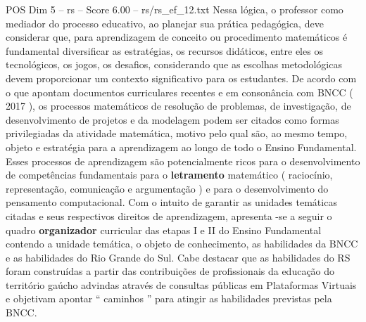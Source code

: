\begin{textsample}{POS Dim 5 – rs – Score 6.00 – rs/rs\_ef\_12.txt}
Nessa lógica, o professor como mediador do processo educativo, ao planejar sua prática pedagógica, deve considerar que, para aprendizagem de conceito ou procedimento matemáticos é fundamental diversificar as estratégias, os recursos didáticos, entre eles os tecnológicos, os jogos, os desafios, considerando que as escolhas metodológicas devem proporcionar um contexto significativo para os estudantes.
De acordo com o que apontam documentos curriculares recentes e em consonância com BNCC ( 2017 ), os processos matemáticos de resolução de problemas, de investigação, de desenvolvimento de projetos e da modelagem podem ser citados como formas privilegiadas da atividade matemática, motivo pelo qual são, ao mesmo tempo, objeto e estratégia para a aprendizagem ao longo de todo o Ensino Fundamental.
Esses processos de aprendizagem são potencialmente ricos para o desenvolvimento de competências fundamentais para o \textbf{letramento} matemático ( raciocínio, representação, comunicação e argumentação ) e para o desenvolvimento do pensamento computacional.
Com o intuito de garantir as unidades temáticas citadas e seus respectivos direitos de aprendizagem, apresenta -se a seguir o quadro \textbf{organizador} curricular das etapas I e II do Ensino Fundamental contendo a unidade temática, o objeto de conhecimento, as habilidades da BNCC e as habilidades do Rio Grande do Sul.
Cabe destacar que as habilidades do RS foram construídas a partir das contribuições de profissionais da educação do território gaúcho advindas através de consultas públicas em Plataformas Virtuais e objetivam apontar “ caminhos ” para atingir as habilidades previstas pela BNCC.

\end{textsample}
